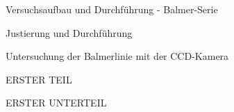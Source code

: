 \documentclass[pdftex, a4paper,11pt, twoside, ngerman]{report}
\begin{document}
\begin{chapter}{Versuchsaufbau und Durchführung - Balmer-Serie}
\begin{section}{Justierung und Durchführung}
\begin{subsection}{Untersuchung der Balmerlinie mit der CCD-Kamera}

      \end{subsection}

      \end{section}

  \end{chapter}
  
  
  \begin{appendix}
    \label{Anhang}
    
    
    
    \begin{chapter}{ERSTER TEIL}
      \label{Anhang:chp:ERSTERTEIL}
      
      
      
      \begin{section}{ERSTER UNTERTEIL}
        \label{Anhang:chp:ERSTERTEIL:sec:UNTERTEIL}
       
       
       
      \end{section}
      
      
    \end{chapter}
    
  \end{appendix}
  
  
  
\end{document}
